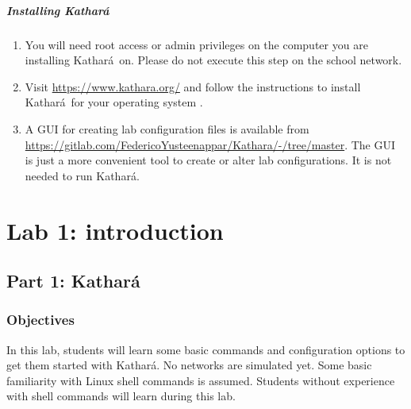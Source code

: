 \documentclass[12pt]{book}
\newcommand{\kathara}{Kathar\'a}
\begin{document}
\paragraph{Installing \kathara}

\begin{enumerate}[label=(\arabic*)]
\item You will need root access or admin privileges on
  the computer you are installing \kathara\ on. Please do not execute
  this step on the school network.

\item Visit \url{https://www.kathara.org/} and follow the instructions to install \kathara\ for your operating system \cite{kathara-wiki}.

\item A GUI for creating lab configuration files is available from \url{https://gitlab.com/FedericoYusteenappar/Kathara/-/tree/master}. The GUI is just a more convenient tool to create or alter lab configurations. It is not needed to run \kathara.
  
\end{enumerate}




\chapter{Lab 1: introduction}

\section{Part 1: \kathara}

\subsection{Objectives}

In this lab, students will learn some basic commands and configuration options to get them started with \kathara. No networks are simulated yet. Some basic familiarity with Linux shell commands is assumed. Students without experience with shell commands will learn during this lab.
\end{document}
